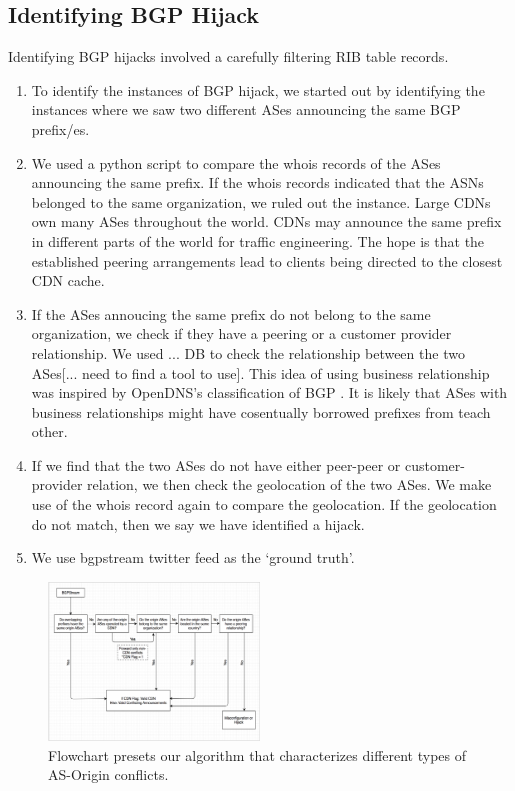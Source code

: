 \subsection{Identifying BGP Hijack}
Identifying BGP hijacks involved a carefully filtering RIB table records. 
\begin{enumerate}
\item To identify the instances of BGP hijack, we started out by identifying the instances where we saw two different ASes announcing the same BGP prefix/es.
\item We used a python script to compare the whois records of the ASes announcing the same prefix. If the whois records indicated that the ASNs belonged to the same organization, we ruled out the instance. Large CDNs own many ASes throughout the world. CDNs may announce the same prefix in different parts of the world for traffic engineering. The hope is that the established peering arrangements lead to clients being directed to the closest CDN cache.
\item If the ASes annoucing the same prefix do not belong to the same organization, we check if they have a peering or a customer provider relationship.   We used ... DB to check the relationship between the two ASes[... need to find a tool to use]. This idea of using business relationship was inspired by OpenDNS's classification of BGP \cite{opendns_blackhat_2015}. It is likely that ASes with business relationships might have cosentually borrowed prefixes from teach other.  
\item If we find that the two ASes do not have either peer-peer or customer-provider relation, we then check the geolocation of the two ASes. We make use of the whois record again to compare the geolocation. If the geolocation do not match, then we say we have identified a hijack. 
\item We use bgpstream twitter feed as the `ground truth'. 
\end{enumerate}
 \begin{figure}[!htbp]
	\includegraphics[width=0.5\textwidth]{Algorithm_flowchart.png}
	\caption{Flowchart presets our algorithm that characterizes different types of AS-Origin conflicts.}
	\label{a:label}
\end{figure}
